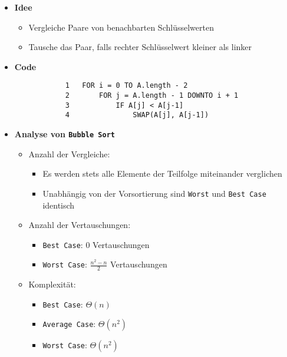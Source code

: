     \begin{itemize}
        \item \textbf{Idee}
            \begin{itemize}
                \item Vergleiche Paare von benachbarten Schlüsselwerten
                \item Tausche das Paar, falls rechter Schlüsselwert kleiner als linker
            \end{itemize}
        
        \item \textbf{Code}
            \begin{verbatim}  
            1   FOR i = 0 TO A.length - 2
            2       FOR j = A.length - 1 DOWNTO i + 1
            3           IF A[j] < A[j-1]
            4               SWAP(A[j], A[j-1])
            \end{verbatim}

        \item \textbf{Analyse von \texttt{Bubble Sort}}
            \begin{itemize}
                \item Anzahl der Vergleiche:
                    \begin{itemize}
                        \item Es werden stets alle Elemente der Teilfolge miteinander verglichen
                        \item Unabhängig von der Vorsortierung sind \texttt{Worst} und \texttt{Best Case} identisch
                    \end{itemize}
                
                \item Anzahl der Vertauschungen:
                    \begin{itemize}
                        \item \texttt{Best Case}: 0 Vertauschungen
                        \item \texttt{Worst Case}: $\frac{n^2-n}{2}$ Vertauschungen
                    \end{itemize}
                
                \item Komplexität:
                    \begin{itemize}
                        \item \texttt{Best Case}: $\Theta(n)$
                        \item \texttt{Average Case}: $\Theta(n^2)$
                        \item \texttt{Worst Case}: $\Theta(n^2)$
                    \end{itemize}
            \end{itemize}
        
    \end{itemize}

